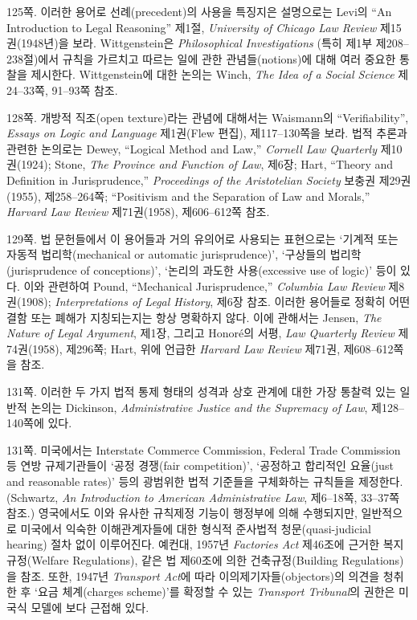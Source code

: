 {\footnotesize
\noteentry 125쪽.  이러한 용어로 선례(precedent)의 사용을 특징지은 설명으로는 Levi의 “An
Introduction to Legal Reasoning” 제1절, \emph{University of Chicago Law
Review} 제15권(1948년)을 보라. Wittgenstein은 \emph{Philosophical
Investigations} (특히 제1부 제208--238절)에서 규칙을 가르치고 따르는
일에 관한 관념들(notions)에 대해 여러 중요한 통찰을 제시한다.
Wittgenstein에 대한 논의는 Winch, \emph{The Idea of a Social Science}
제24--33쪽, 91--93쪽 참조.

\noteentry 128쪽.  개방적 직조(open texture)라는 관념에
대해서는 Waismann의 “Verifiability”, \emph{Essays on Logic and
Language} 제1권(Flew 편집), 제117--130쪽을 보라. 법적 추론과 관련한
논의로는 Dewey, “Logical Method and Law,” \emph{Cornell Law Quarterly}
제10권(1924); Stone, \emph{The Province and Function of Law}, 제6장;
Hart, “Theory and Definition in Jurisprudence,” \emph{Proceedings of
the Aristotelian Society} 보충권 제29권(1955), 제258--264쪽;
“Positivism and the Separation of Law and Morals,” \emph{Harvard Law
Review} 제71권(1958), 제606--612쪽 참조.

\noteentry 129쪽.  법
문헌들에서 이 용어들과 거의 유의어로 사용되는 표현으로는 ‘기계적 또는
자동적 법리학(mechanical or automatic jurisprudence)’, ‘구상들의
법리학(jurisprudence of conceptions)’, ‘논리의 과도한 사용(excessive use
of logic)’ 등이 있다. 이와 관련하여 Pound, “Mechanical Jurisprudence,”
\emph{Columbia Law Review} 제8권(1908); \emph{Interpretations of Legal
History}, 제6장 참조. 이러한 용어들로 정확히 어떤 결함 또는 폐해가
지칭되는지는 항상 명확하지 않다. 이에 관해서는 Jensen, \emph{The Nature
of Legal Argument}, 제1장, 그리고 Honoré의 서평, \emph{Law Quarterly
Review} 제74권(1958), 제296쪽; Hart, 위에 언급한 \emph{Harvard Law
Review} 제71권, 제608--612쪽을 참조.

\noteentry 131쪽.  이러한 두 가지 법적 통제 형태의 성격과 상호 관계에 대한 가장
통찰력 있는 일반적 논의는 Dickinson, \emph{Administrative Justice and
the Supremacy of Law}, 제128--140쪽에 있다.

\noteentry 131쪽.  미국에서는 Interstate
Commerce Commission, Federal Trade Commission 등 연방 규제기관들이 ‘공정
경쟁(fair competition)’, ‘공정하고 합리적인 요율(just and reasonable
rates)’ 등의 광범위한 법적 기준들을 구체화하는 규칙들을 제정한다.
(Schwartz, \emph{An Introduction to American Administrative Law},
제6--18쪽, 33--37쪽 참조.) 영국에서도 이와 유사한 규칙제정 기능이
행정부에 의해 수행되지만, 일반적으로 미국에서 익숙한 이해관계자들에 대한
형식적 준사법적 청문(quasi-judicial hearing) 절차 없이 이루어진다.
예컨대, 1957년 \emph{Factories Act} 제46조에 근거한 복지규정(Welfare
Regulations), 같은 법 제60조에 의한 건축규정(Building Regulations)을
참조. 또한, 1947년 \emph{Transport Act}에 따라 이의제기자들(objectors)의
의견을 청취한 후 ‘요금 체계(charges scheme)’를 확정할 수 있는
\emph{Transport Tribunal}의 권한은 미국식 모델에 보다 근접해 있다.

}
